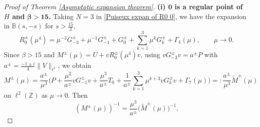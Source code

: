 \documentclass[10pt,a4paper]{amsart}
\newcommand\Z{\mathbb{Z}}
\newcommand\B{\mathbb{B}}
\numberwithin{equation}{section}
\begin{document}
\setcounter{section}{5}
\setcounter{equation}{15}
\setcounter{definition}{4}
\begin{proof}[Proof of Theorem {\rm\ref{Asymptotic expansion theorem}}]{\bf{(i) ${\bm{0}}$ is a regular point of $H$ and {$\bm{\beta>15}$}.}}
Taking $N=3$ in \eqref{Puiseux expan of R0 0}, we have the expansion in $\B(s,-s)$ for $s>\frac{15}{2}$,
\begin{equation*}
R^{\pm}_0(\mu^4)=\mu^{-3}G^{\pm}_{-3}+\mu^{-1}G^{\pm}_{-1}+G^{\pm}_0+\sum\limits_{k=1}^{3}\mu^kG^{\pm}_{k}+\Gamma_4(\mu),\qquad \mu \rightarrow0.
\end{equation*}
Since $\beta>15$ and $M^{\pm}(\mu)=U+vR^{\pm}_0(\mu^4)v$, using $vG^{\pm}_{-3}v=a^{\pm}P$ with $a^{\pm}=\frac{-1\pm i}{4}\|V\|_{\ell^1}$, we obtain 
 \begin{equation*}
 M^{\pm}(\mu)=\frac{a^{\pm}}{\mu^3}\Big(P+\frac{\mu^2}{a^{\pm}}vG^{\pm}_{-1}v+\frac{\mu^3}{a^{\pm}}T_0+\frac{1}{a^{\pm}}\sum\limits_{k=1}^{3}\mu^{k+3}vG^{\pm}_{k}v+\Gamma_7(\mu)\Big)=:\frac{a^{\pm}}{\mu^3}\widetilde{M}^{\pm}(\mu)
 \end{equation*}
 on $\ell^2(\Z)$ as $\mu\rightarrow0$. Then
\begin{equation}\label{Relat of M and M tuta} \left(M^{\pm}(\mu)\right)^{-1}=\frac{\mu^3}{a^{\pm}}\big(\widetilde{M}^{\pm}(\mu)\big)^{-1}.
\end{equation}


\end{proof}
\end{document}
